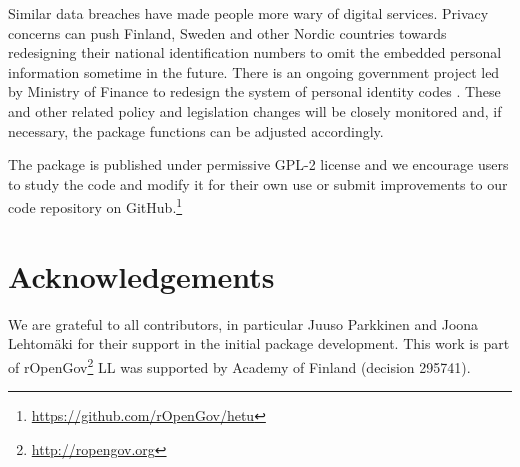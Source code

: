 Similar data breaches have made people more wary of digital services. Privacy concerns can push Finland, Sweden and other Nordic countries towards redesigning their national identification numbers to omit the embedded personal information sometime in the future. There is an ongoing government project led by Ministry of Finance to redesign the system of personal identity codes \citep{hetuvm}. These and other related policy and legislation changes will be closely monitored and, if necessary, the package functions can be adjusted accordingly.

The package is published under permissive GPL-2 license and we encourage users to study the code and modify it for their own use or submit improvements to our code repository on GitHub.\footnote{\url{https://github.com/rOpenGov/hetu}}

\section{Acknowledgements}

We are grateful to all contributors, in particular Juuso Parkkinen and Joona Lehtomäki for their support in the initial package development. This work is part of rOpenGov\footnote{\url{http://ropengov.org}} LL was supported by Academy of Finland (decision 295741).



\address{Pyry Kantanen\\
  Department of Computing\\
  PO Box 20014 University of Turku\\
  Finland\\
  ORCiD: 0000-0003-2853-2765\\
  }

\address{Måns Magnusson\\
  Department of Statistics\\
  Uppsala University\\
  Sweden\\
  ORCiD: 0000-0002-0296-2719\\
  }

\address{Leo Lahti\\
  Department of Computing\\
  PO Box 20014 University of Turku\\
  Finland\\
  ORCiD: 0000-0001-5537-637X\\
  }
